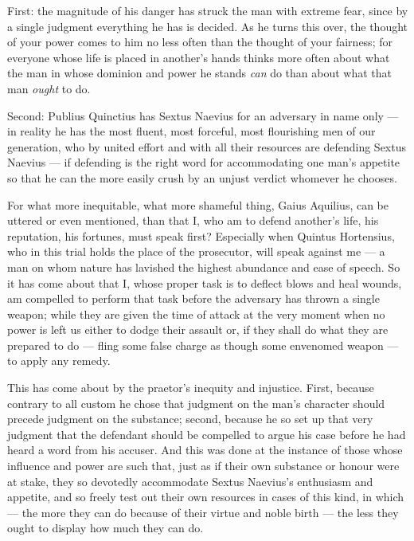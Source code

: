  First: the magnitude of his danger has struck the man with extreme fear, since by a single judgment everything he has is decided. As he turns this over, the thought of your power comes to him no less often than the thought of your fairness; for everyone whose life is placed in another's hands thinks more often about what the man in whose dominion and power he stands \emph{can} do than about what that man \emph{ought} to do.

 Second: Publius Quinctius has Sextus Naevius for an adversary in name only --- in reality he has the most fluent, most forceful, most flourishing men of our generation, who by united effort and with all their resources are defending Sextus Naevius --- if defending is the right word for accommodating one man's appetite so that he can the more easily crush by an unjust verdict whomever he chooses.

 For what more inequitable, what more shameful thing, Gaius Aquilius, can be uttered or even mentioned, than that I, who am to defend another's life, his reputation, his fortunes, must speak first? Especially when Quintus Hortensius, who in this trial holds the place of the prosecutor, will speak against me --- a man on whom nature has lavished the highest abundance and ease of speech. So it has come about that I, whose proper task is to deflect blows and heal wounds, am compelled to perform that task before the adversary has thrown a single weapon; while they are given the time of attack at the very moment when no power is left us either to dodge their assault or, if they shall do what they are prepared to do — fling some false charge as though some envenomed weapon — to apply any remedy.

 This has come about by the praetor's inequity and injustice. First, because contrary to all custom he chose that judgment on the man's character should precede judgment on the substance; second, because he so set up that very judgment that the defendant should be compelled to argue his case before he had heard a word from his accuser. And this was done at the instance of those whose influence and power are such that, just as if their own substance or honour were at stake, they so devotedly accommodate Sextus Naevius's enthusiasm and appetite, and so freely test out their own resources in cases of this kind, in which --- the more they can do because of their virtue and noble birth --- the less they ought to display how much they can do.

